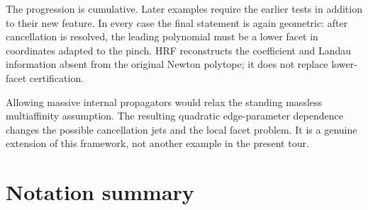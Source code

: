 \documentclass[a4paper,11pt]{article}
\begin{document}
The progression is cumulative.  Later examples require the earlier tests in
addition to their new feature.  In every case the final statement is again
geometric: after cancellation is resolved, the leading polynomial must be a
lower facet in coordinates adapted to the pinch.  HRF reconstructs the
coefficient and Landau information absent from the original Newton polytope;
it does not replace lower-facet certification.

Allowing massive internal propagators would relax the standing massless
multiaffinity assumption.  The resulting quadratic edge-parameter dependence
changes the possible cancellation jets and the local facet problem.  It is a
genuine extension of this framework, not another example in the present
tour.

\appendix
\section{Notation summary}
\end{document}

